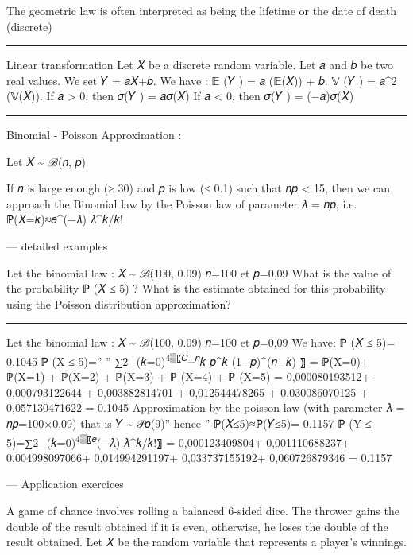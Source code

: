 \documentclass[
  letterpaper,
  DIV=11,
  numbers=noendperiod]{scrreprt}
\begin{document}
The geometric law is often interpreted as being the lifetime or the date
of death (discrete)

\begin{center}\rule{0.5\linewidth}{0.5pt}\end{center}

Linear transformation Let 𝑋 be a discrete random variable. Let 𝑎 and 𝑏
be two real values. We set 𝑌 = 𝑎𝑋+𝑏. We have : 𝔼 (𝑌 ) = 𝑎 (𝔼(𝑋)) + 𝑏. 𝕍
(𝑌 ) = 𝑎\^{}2 (𝕍(𝑋)). If 𝑎 \textgreater{} 0, then 𝜎(𝑌 ) = 𝑎𝜎(𝑋) If 𝑎
\textless{} 0, then 𝜎(𝑌 ) = (−𝑎)𝜎(𝑋)

\begin{center}\rule{0.5\linewidth}{0.5pt}\end{center}

Binomial - Poisson Approximation :

Let 𝑋 \textasciitilde{} ℬ(𝑛, 𝑝)

If 𝑛 is large enough (≥ 30) and 𝑝 is low (≤ 0.1) such that 𝑛𝑝
\textless{} 15, then we can approach the Binomial law by the Poisson law
of parameter 𝜆 = 𝑛𝑝, i.e.~ ℙ(𝑋=𝑘)≈𝑒\^{}(−𝜆) 𝜆\^{}𝑘/𝑘!

--- detailed examples

Let the binomial law : 𝑋 \textasciitilde{} ℬ(100, 0.09) 𝑛=100 et 𝑝=0,09
What is the value of the probability ℙ (𝑋 ≤ 5) ? What is the estimate
obtained for this probability using the Poisson distribution
approximation?

\begin{center}\rule{0.5\linewidth}{0.5pt}\end{center}

Let the binomial law : 𝑋 \textasciitilde{} ℬ(100, 0.09) 𝑛=100 et 𝑝=0,09
We have: ℙ (𝑋 ≤ 5)= 0.1045 ℙ (X ≤ 5)='' ''
∑2\_(𝑘=0)\textsuperscript{4▒〖𝐶\_𝑛}𝑘 𝑝\^{}𝑘 (1−𝑝)\^{}(𝑛−𝑘) 〗 = ℙ(X=0)+
ℙ(X=1) + ℙ(X=2) + ℙ(X=3) + ℙ (X=4) + ℙ (X=5) = 0,000080193512+
0,000793122644 + 0,003882814701 + 0,012544478265 + 0,030086070125 +
0,057130471622 = 0.1045 Approximation by the poisson law (with parameter
𝜆 = 𝑛𝑝=100×0,09) that is 𝑌 \textasciitilde{} 𝒫𝑜(9)'' hence ''
ℙ(𝑋≤5)≈ℙ(𝑌≤5)= 0.1157 ℙ (Y ≤ 5)=∑2\_(𝑘=0)\textsuperscript{4▒〖𝑒}(−𝜆)
𝜆\^{}𝑘/𝑘!〗 = 0,000123409804+ 0,001110688237+ 0,004998097066+
0,014994291197+ 0,033737155192+ 0,060726879346 = 0.1157

--- Application exercices

A game of chance involves rolling a balanced 6-sided dice. The thrower
gains the double of the result obtained if it is even, otherwise, he
loses the double of the result obtained. Let 𝑋 be the random variable
that represents a player's winnings.
\end{document}

